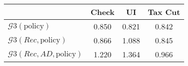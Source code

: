 \begin{tabular}{@{}lccc@{}} 
\toprule 
                          & Check      & UI    & Tax Cut    \\  \midrule 
$\mathcal{G}3(\text{policy})$ & 0.850  & 0.821  & 0.842     \\ 
$\mathcal{G}3(Rec,\text{policy})$ & 0.866  & 1.088  & 0.845     \\ 
$\mathcal{G}3(Rec, AD,\text{policy})$ & 1.220  & 1.364  & 0.966     \\ 
\end{tabular}  
